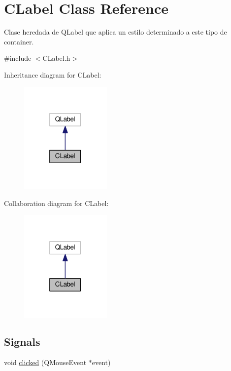 \hypertarget{classCLabel}{}\section{C\+Label Class Reference}
\label{classCLabel}


Clase heredada de \textquotesingle{}Q\+Label\textquotesingle{} que aplica un estilo determinado a este tipo de container.  




{\ttfamily \#include $<$C\+Label.\+h$>$}



Inheritance diagram for C\+Label\+:\nopagebreak
\begin{figure}[H]
\begin{center}
\leavevmode
\includegraphics[width=127pt]{classCLabel__inherit__graph}
\end{center}
\end{figure}


Collaboration diagram for C\+Label\+:\nopagebreak
\begin{figure}[H]
\begin{center}
\leavevmode
\includegraphics[width=127pt]{classCLabel__coll__graph}
\end{center}
\end{figure}
\subsection*{Signals}
\begin{DoxyCompactItemize}
\item 
void \hyperlink{classCLabel_a064d9671b402cbba58344a0d5a4c70e4}{clicked} (Q\+Mouse\+Event $\ast$event)
\end{DoxyCompactItemize}
